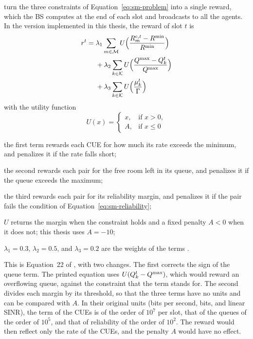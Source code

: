 \citet{li+22fedmarl} turn the three constraints of Equation~\ref{eq:sm-problem} into a single reward, which
the \ac{BS} computes at the end of each slot and broadcasts to all the agents. In the version implemented in
this thesis, the reward of slot $t$ is
\begin{equation}
  \begin{aligned}
    r^t = {} & \lambda_1 \sum_{m \in \mathcal{M}} U\Bigl( \frac{R_m^{\mathrm{c},t} - R^{\mathrm{min}}}{R^{\mathrm{min}}} \Bigr) \\
      & + \lambda_2 \sum_{k \in \mathcal{K}} U\Bigl( \frac{Q^{\mathrm{max}} - Q_k^t}{Q^{\mathrm{max}}} \Bigr) \\
      & + \lambda_3 \sum_{k \in \mathcal{K}} U\Bigl( \frac{\mu_k^t}{\Gamma} \Bigr)
  \end{aligned}
  \label{eq:sm-shared-reward}
\end{equation}
with the utility function \cite[Eq.~23]{li+22fedmarl}
\begin{equation}
  U(x) =
  \begin{cases}
    x, & \text{if } x > 0 , \\
    A, & \text{if } x \le 0
  \end{cases}
  \label{eq:sm-utility}
\end{equation}
\begin{wherelist}
  \item the first term rewards each \ac{CUE} for how much its rate exceeds the minimum, and penalizes it if
    the rate falls short;
  \item the second rewards each pair for the free room left in its queue, and penalizes it if the queue
    exceeds the maximum;
  \item the third rewards each pair for its reliability margin, and penalizes it if the pair fails the
    condition of Equation~\ref{eq:sm-reliability};
  \item $U$ returns the margin when the constraint holds and a fixed penalty $A < 0$ when it does not; this
    thesis uses $A = -10$;
  \item $\lambda_1 = 0.3$, $\lambda_2 = 0.5$, and $\lambda_3 = 0.2$ are the weights of the terms
    \cite[Table~III]{li+22fedmarl}.
\end{wherelist}
This is Equation~22 of \citet{li+22fedmarl}, with two changes. The first corrects the sign of the queue term.
The printed equation uses $U(Q_k^t - Q^{\mathrm{max}})$, which would reward an overflowing queue, against the constraint
that the term stands for. The second divides each margin by its threshold, so that the three terms have no
units and can be compared with $A$. In their original units (bits per second, bits, and linear \ac{SINR}),
the term of the \acp{CUE} is of the order of $10^7$ per slot, that of the queues of the order of $10^5$, and
that of reliability of the order of $10^2$. The reward would then reflect only the rate of the \acp{CUE},
and the penalty $A$ would have no effect.

